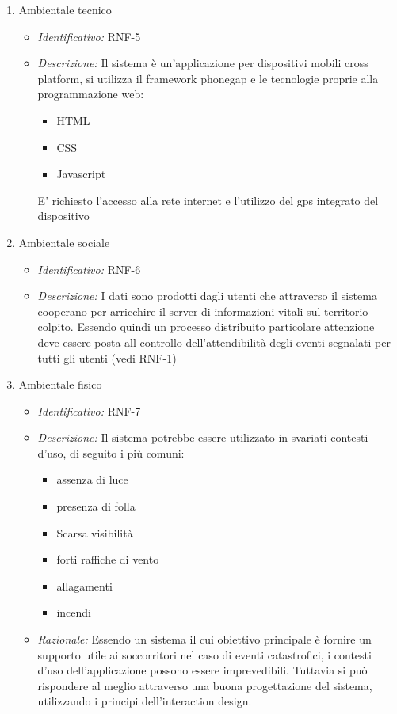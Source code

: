 \begin{enumerate}
    \item Ambientale tecnico
  \begin{itemize}
  \item\textit{Identificativo:} RNF-5
  \item\textit{Descrizione:} Il sistema è un’applicazione per dispositivi mobili cross platform, si utilizza il framework phonegap e le tecnologie proprie alla programmazione web:
  \begin{itemize}
  \item HTML
  \item CSS
  \item Javascript
  \end{itemize}
E’ richiesto l’accesso alla rete internet e l’utilizzo del gps integrato del dispositivo
  \end{itemize}
 \newpage
\item Ambientale sociale
  \begin{itemize}
  \item\textit{Identificativo:} RNF-6
  \item\textit{Descrizione:} I dati sono prodotti dagli utenti che attraverso il sistema cooperano per arricchire il server di informazioni vitali sul territorio colpito. Essendo quindi un processo distribuito particolare attenzione deve essere posta all controllo dell’attendibilità degli eventi segnalati per tutti gli utenti (vedi RNF-1)
  \end{itemize}

  \item Ambientale fisico
  \begin{itemize}
  \item\textit{Identificativo:} RNF-7
  \item\textit{Descrizione:} Il sistema potrebbe essere utilizzato in svariati contesti d’uso, di seguito i più comuni:
	\begin{itemize}
	\item assenza di luce
	\item presenza di folla
	\item Scarsa visibilità
	\item forti raffiche di vento
	\item allagamenti
	\item incendi
	\end{itemize}
    \item\textit{Razionale:} Essendo un sistema il cui obiettivo principale è fornire un supporto utile ai soccorritori nel caso di eventi catastrofici, i contesti d’uso dell’applicazione possono essere imprevedibili. Tuttavia si può rispondere al meglio attraverso una buona progettazione del sistema, utilizzando i principi dell’interaction design.
  \end{itemize}
  

\end{enumerate}
